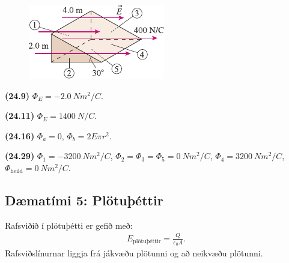 \begin{enumerate}[label = \textbf{(\alph*)}]
\begin{figure}[H]
    \centering
    \includegraphics{figures/rk2429.pdf}
\end{figure}

\end{enumerate}

\begin{tcolorbox}
\begin{enumerate*}[label = \vspace{0.15cm} ]
  \item \textbf{(24.9)} $\Phi_E = \SI{-2.0}{Nm^2/C}$.
  \item \textbf{(24.11)} $\Phi_E = \SI{1400}{N/C}$.
  \item \textbf{(24.16)} $\Phi_a = 0$, $\Phi_b = 2E\pi r^2 $.
  \item \textbf{(24.29)} $\Phi_1 = \SI{-3200}{Nm^2/C}$, $\Phi_2 = \Phi_3 = \Phi_5 = \SI{0}{Nm^2/C}$, $\Phi_4 = \SI{3200}{Nm^2/C}$, $\Phi_{\text{heild}} = \SI{0}{Nm^2/C}$.
\end{enumerate*}
\end{tcolorbox}

\newpage

\subsection*{Dæmatími 5: Plötuþéttir}

\begin{tcolorbox}
Rafsviðið í plötuþétti er gefið með:
\begin{align*}
    E_{\text{plötuþéttir}} = \frac{Q}{\varepsilon_0 A}.
\end{align*}
Rafsviðslínurnar liggja frá jákvæðu plötunni og að neikvæðu plötunni.
\end{tcolorbox}

